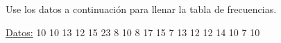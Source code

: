 \documentclass{cdplf-prueba}
\begin{document}
\subsection{}

Use los datos a continuación para llenar la tabla de frecuencias.

\underline{Datos:} \hspace{4pt} 10 \hspace{4pt}\textbullet\hspace{4pt} 10 \hspace{4pt}\textbullet\hspace{4pt} 13 \hspace{4pt}\textbullet\hspace{4pt} 12 \hspace{4pt}\textbullet\hspace{4pt} 15 \hspace{4pt}\textbullet\hspace{4pt} 23 \hspace{4pt}\textbullet\hspace{4pt} 8 \hspace{4pt}\textbullet\hspace{4pt} 10 \hspace{4pt}\textbullet\hspace{4pt} 8 \hspace{4pt}\textbullet\hspace{4pt} 17 \hspace{4pt}\textbullet\hspace{4pt} 15 \hspace{4pt}\textbullet\hspace{4pt} 7 \hspace{4pt}\textbullet\hspace{4pt} 13 \hspace{4pt}\textbullet\hspace{4pt} 12 \hspace{4pt}\textbullet\hspace{4pt} 12 \hspace{4pt}\textbullet\hspace{4pt} 14 \hspace{4pt}\textbullet\hspace{4pt} 10 \hspace{4pt}\textbullet\hspace{4pt} 7 \hspace{4pt}\textbullet\hspace{4pt} 10
\end{document}
